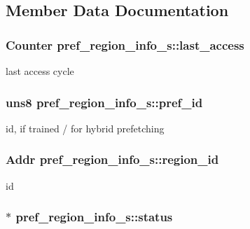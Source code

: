 \subsection{Member Data Documentation}
\hypertarget{structpref__region__info__s_a00cfcb04472cf7cf9c0beb50cac2a7b7}{
\subsubsection[{last\_\-access}]{\setlength{\rightskip}{0pt plus 5cm}Counter {\bf pref\_\-region\_\-info\_\-s::last\_\-access}}}
\label{structpref__region__info__s_a00cfcb04472cf7cf9c0beb50cac2a7b7}
last access cycle \hypertarget{structpref__region__info__s_a7418a9a12dbe0cc8a6c87d2ee87b171d}{
\subsubsection[{pref\_\-id}]{\setlength{\rightskip}{0pt plus 5cm}uns8 {\bf pref\_\-region\_\-info\_\-s::pref\_\-id}}}
\label{structpref__region__info__s_a7418a9a12dbe0cc8a6c87d2ee87b171d}
id, if trained / for hybrid prefetching \hypertarget{structpref__region__info__s_a2365e6799e297f0107b7e9abd34eca8b}{
\subsubsection[{region\_\-id}]{\setlength{\rightskip}{0pt plus 5cm}Addr {\bf pref\_\-region\_\-info\_\-s::region\_\-id}}}
\label{structpref__region__info__s_a2365e6799e297f0107b7e9abd34eca8b}
id \hypertarget{structpref__region__info__s_ab3d02274c3da7cee73baf6d9b453ca89}{
\subsubsection[{status}]{$\ast$ {\bf pref\_\-region\_\-info\_\-s::status}}}
